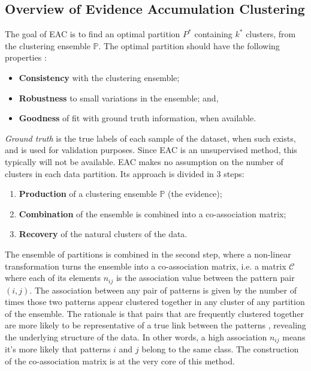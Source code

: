 
\subsection{Overview of Evidence Accumulation Clustering}
\label{sec:eac overview}

The goal of EAC is to find an optimal partition $P^*$ containing $k^*$ clusters, from the clustering ensemble $\mathbb{P}$. The optimal partition should have the following properties \cite{Fred2005}:

\begin{itemize}
	\item \textbf{Consistency} with the clustering ensemble;
	\item \textbf{Robustness} to small variations in the ensemble; and,
	\item \textbf{Goodness} of fit with ground truth information, when available.
\end{itemize}

\emph{Ground truth} is the true labels of each sample of the dataset, when such exists, and is used for validation purposes.
Since EAC is an unsupervised method, this typically will not be available.
EAC makes no assumption on the number of clusters in each data partition.
Its approach is divided in 3 steps:

\begin{enumerate}
\item \textbf{Production} of a clustering ensemble $\mathbb{P}$ (the evidence);
\item \textbf{Combination} of the ensemble is combined into a co-association matrix;
\item \textbf{Recovery} of the natural clusters of the data.
\end{enumerate}

The ensemble of partitions is combined in the second step, where a non-linear transformation turns the ensemble into a co-association matrix, i.e. a matrix $\mathcal{C}$ where each of its elements $n_{ij}$ is the association value between the pattern pair $(i,j)$.
The association between any pair of patterns is given by the number of times those two patterns appear clustered together in any cluster of any partition of the ensemble.
The rationale is that pairs that are frequently clustered together are more likely to be representative of a true link between the patterns \cite{Fred2005}, revealing the underlying structure of the data.
In other words, a high association $n_{ij}$ means it's more likely that patterns $i$ and $j$ belong to the same class.
The construction of the co-association matrix is at the very core of this method.

